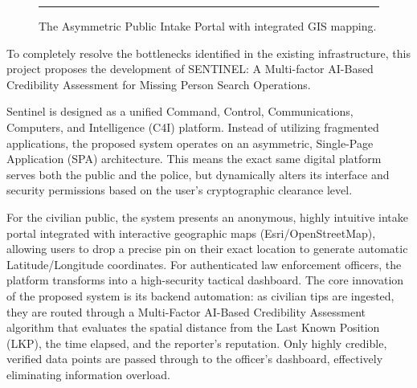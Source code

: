 \documentclass[12pt,a4paper]{report}
\begin{document}
\begin{figure}[H]
    \centering
    \rule{10cm}{6cm} %
    \caption{The Asymmetric Public Intake Portal with integrated GIS mapping.}
\end{figure}

To completely resolve the bottlenecks identified in the existing infrastructure, this project proposes the development of SENTINEL: A Multi-factor AI-Based Credibility Assessment for Missing Person Search Operations.

Sentinel is designed as a unified Command, Control, Communications, Computers, and Intelligence (C4I) platform. Instead of utilizing fragmented applications, the proposed system operates on an asymmetric, Single-Page Application (SPA) architecture. This means the exact same digital platform serves both the public and the police, but dynamically alters its interface and security permissions based on the user's cryptographic clearance level. 

For the civilian public, the system presents an anonymous, highly intuitive intake portal integrated with interactive geographic maps (Esri/OpenStreetMap), allowing users to drop a precise pin on their exact location to generate automatic Latitude/Longitude coordinates. For authenticated law enforcement officers, the platform transforms into a high-security tactical dashboard. The core innovation of the proposed system is its backend automation: as civilian tips are ingested, they are routed through a Multi-Factor AI-Based Credibility Assessment algorithm that evaluates the spatial distance from the Last Known Position (LKP), the time elapsed, and the reporter's reputation. Only highly credible, verified data points are passed through to the officer's dashboard, effectively eliminating information overload.
\end{document}
